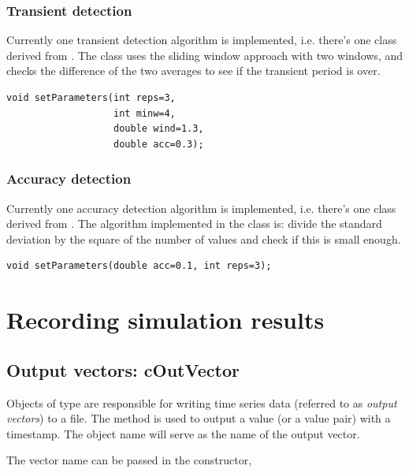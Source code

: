 \subsubsection{Transient detection}


Currently one transient detection algorithm
is implemented, i.e.  there's one class derived from
. The  class
uses the sliding window approach with two windows, and checks the
difference of the two averages to see if the transient period is over.

\begin{verbatim}
void setParameters(int reps=3,
                   int minw=4,
                   double wind=1.3,
                   double acc=0.3);
\end{verbatim}

\subsubsection{Accuracy detection}


Currently one accuracy detection algorithm
is implemented, i.e.  there's one class derived from
. The algorithm implemented in the
 class is: divide the standard deviation by the
square of the number of values and check if this is small enough.

\begin{verbatim}
void setParameters(double acc=0.1, int reps=3);
\end{verbatim}




\section{Recording simulation results}

\subsection{Output vectors: cOutVector}
\label{sec:ch-sim-lib:coutvector}

Objects of type  are responsible for writing time series
data (referred to as \textit{output vectors}) to a file. The 
method is used to output a value (or a value pair) with a timestamp.
The object name will serve as the name of the output vector.

The vector name can be passed in the constructor,


